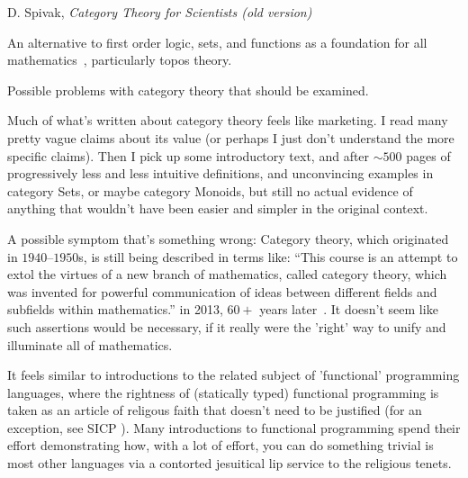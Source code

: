 \documentclass[11pt,openany]{article}
\begin{document}
{D. Spivak, \textit{Category Theory for Scientists 
(old version)}~\cite{spivakd-2013}}

\pagebreak
An alternative to first order logic, sets, 
and functions as a foundation for all
mathematics~\cite{feferman-1977-FEFCFA},  
particularly topos theory.


\setcounter{currentlevel}{\value{baseSectionLevel}}
\label{sec:Doubts}

Possible problems with category theory that should be examined.

\label{sec:Hype}

Much of what's written about category theory feels like marketing.
I read many pretty vague claims about its value
(or perhaps I just don't understand the more specific claims).
Then I pick up some introductory text,
and after $\sim 500$ pages of progressively less and less 
intuitive definitions, and unconvincing examples in category Sets,
or maybe category Monoids,
but still no actual evidence of anything that wouldn't have been
easier and simpler in the original context.

A possible symptom that's something wrong:
Category theory, which originated in $1940$--$1950$s,
is still being described in terms like:
``This course is an attempt to extol the virtues of a new branch of mathematics,
called category theory, which was invented for powerful communication of ideas between
different fields and subfields within mathematics.''
in 2013, $60+$ years later~\cite{spivakd-2013}.
It doesn't seem like such assertions would be necessary,
if it really were the 'right' way to unify 
and illuminate all of mathematics.

It feels similar to introductions to the related subject of
'functional' programming languages,
where the rightness of (statically typed) functional programming 
is taken as
an article of religous faith that doesn't need to be justified
(for an exception, see SICP \cite{Abelson1996}).
Many introductions to functional programming spend their
effort demonstrating how, with a lot of effort, you can do
something trivial is most other languages
via a contorted jesuitical lip service to the religious tenets.

\label{sec:Shaky-foundations}
\end{document}

